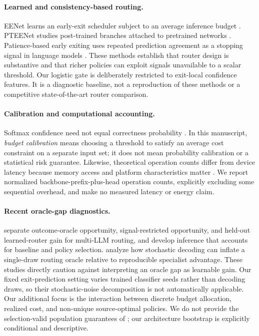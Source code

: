 \documentclass[11pt,a4paper]{article}
\begin{document}
\paragraph{Learned and consistency-based routing.}
EENet learns an early-exit scheduler subject to an average inference budget \citep{eenet}. PTEENet studies post-trained branches attached to pretrained networks \citep{pteenet}. Patience-based early exiting uses repeated prediction agreement as a stopping signal in language models \citep{patience}. These methods establish that router design is substantive and that richer policies can exploit signals unavailable to a scalar threshold. Our logistic gate is deliberately restricted to exit-local confidence features. It is a diagnostic baseline, not a reproduction of these methods or a competitive state-of-the-art router comparison.

\paragraph{Calibration and computational accounting.}
Softmax confidence need not equal correctness probability \citep{calibration}. In this manuscript, \emph{budget calibration} means choosing a threshold to satisfy an average cost constraint on a separate input set; it does not mean probability calibration or a statistical risk guarantee. Likewise, theoretical operation counts differ from device latency because memory access and platform characteristics matter \citep{shuffle}. We report normalized backbone-prefix-plus-head operation counts, explicitly excluding some sequential overhead, and make no measured latency or energy claim.

\paragraph{Recent oracle-gap diagnostics.}
\citet{selection} separate outcome-oracle opportunity, signal-restricted opportunity, and held-out learned-router gain for multi-LLM routing, and develop inference that accounts for baseline and policy selection. \citet{routingnoise} analyze how stochastic decoding can inflate a single-draw routing oracle relative to reproducible specialist advantage. These studies directly caution against interpreting an oracle gap as learnable gain. Our fixed exit-prediction setting varies trained classifier seeds rather than decoding draws, so their stochastic-noise decomposition is not automatically applicable. Our additional focus is the interaction between discrete budget allocation, realized cost, and non-unique source-optimal policies. We do not provide the selection-valid population guarantees of \citet{selection}; our architecture bootstrap is explicitly conditional and descriptive.
\end{document}
